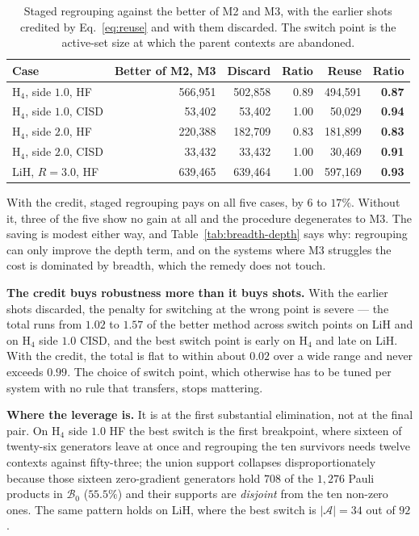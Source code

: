 \documentclass[10pt]{article}
\begin{document}
\begin{table}[!htbp]
\centering
\scriptsize
\caption{Staged regrouping against the better of M2 and M3, with the earlier shots credited by Eq.~\eqref{eq:reuse} and with them discarded. The switch point is the active-set size at which the parent contexts are abandoned.}
\label{tab:hybrid}
\begin{tabular}{lrrrrr}
\toprule
Case & Better of M2, M3 & Discard & Ratio & Reuse & Ratio \\
\midrule
H$_4$, side $1.0$, HF   & 566,951 & 502,858 & 0.89 & 494,591 & \textbf{0.87} \\
H$_4$, side $1.0$, CISD & 53,402  & 53,402 & 1.00 & 50,029 & \textbf{0.94} \\
H$_4$, side $2.0$, HF   & 220,388 & 182,709 & 0.83 & 181,899 & \textbf{0.83} \\
H$_4$, side $2.0$, CISD & 33,432  & 33,432 & 1.00 & 30,469 & \textbf{0.91} \\
LiH, $R{=}3.0$, HF      & 639,465 & 639,464 & 1.00 & 597,169 & \textbf{0.93} \\
\bottomrule
\end{tabular}
\end{table}

With the credit, staged regrouping pays on all five cases, by $6$ to $17\%$.
Without it, three of the five show no gain at all and the procedure degenerates to
M3. The saving is modest either way, and Table~\ref{tab:breadth-depth} says why:
regrouping can only improve the depth term, and on the systems where M3 struggles
the cost is dominated by breadth, which the remedy does not touch.

\textbf{The credit buys robustness more than it buys shots.} With the earlier
shots discarded, the penalty for switching at the wrong point is severe --- the
total runs from $1.02$ to $1.57$ of the better method across switch points on LiH
and on H$_4$ side $1.0$ CISD, and the best switch point is early on H$_4$ and late
on LiH. With the credit, the total is flat to within about $0.02$ over a wide
range and never exceeds $0.99$. The choice of switch point, which otherwise has to
be tuned per system with no rule that transfers, stops mattering.

\textbf{Where the leverage is.} It is at the first substantial elimination, not at
the final pair. On H$_4$ side $1.0$ HF the best switch is the first breakpoint,
where sixteen of twenty-six generators leave at once and regrouping the ten
survivors needs twelve contexts against fifty-three; the union support collapses
disproportionately because those sixteen zero-gradient generators hold $708$ of
the $1{,}276$ Pauli products in $\mathcal B_0$ ($55.5\%$) and their supports are
\emph{disjoint} from the ten non-zero ones. The same pattern holds on LiH, where
the best switch is $|\mathcal A|=34$ out of $92$.
\end{document}
